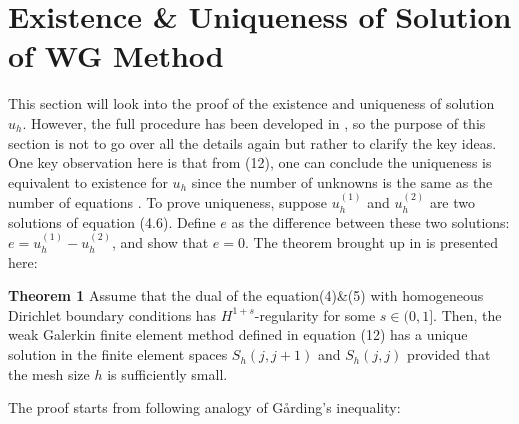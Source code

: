 \documentclass[12pt]{article} %
\begin{document}
\section{Existence \& Uniqueness of Solution of WG Method}
This section will look into the proof of the existence and uniqueness of solution \(u_h\). However, the full procedure has been developed in \cite{Wang2013}, so the purpose of this section is not to go over all the details again but rather to clarify the key ideas.
One key observation here is that from (12), one can conclude the uniqueness is equivalent to existence for \(u_h\) since the number of unknowns is the same as the number of equations \cite{Wang2013}. To prove uniqueness, suppose \( u^{(1)}_h \) and \( u^{(2)}_h \) are two solutions of equation (4.6). Define \( e \) as the difference between these two solutions:
$e = u^{(1)}_h - u^{(2)}_h$, and show that \( e = 0 \). The theorem brought up in \cite{Wang2013} is presented here:

\textbf{Theorem 1}\cite{Wang2013} Assume that the dual of the equation(4)\&(5)
with homogeneous Dirichlet boundary conditions has \(H^{1+s}\)-regularity for some \(s \in (0, 1]\). Then, the weak Galerkin finite element method defined in equation (12) has a unique solution in the finite element spaces \(S_h(j, j+1)\) and \(S_h(j, j)\) provided that the mesh size \(h\) is sufficiently small.

The proof starts from following analogy of Gårding’s inequality:
\end{document}
